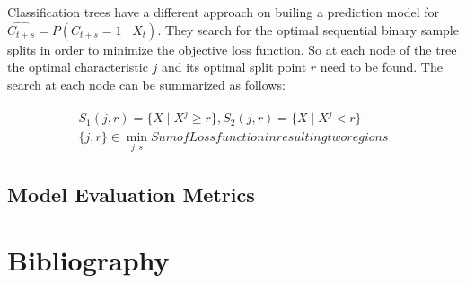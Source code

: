 \documentclass[12pt,titlepage]{article}
\begin{document}
Classification trees have a different approach on builing a prediction model for $\widehat{C_{t+s}} = P(C_{t+s}=1\mid X_{t})$. They search for the optimal sequential binary sample splits in order to minimize the objective loss function. So at each node of the tree the optimal characteristic $j$ and its optimal split point $r$ need to be found. The search at each node can be summarized as follows:

\begin{equation} \label{dec_tree}
    \begin{aligned}
        S_{1}(j, r) = \{X\mid X^{j}\geq r\} , S_{2}(j, r) = \{X\mid X^{j}< r\} \\
        \{j, r\} \in \min_{j, s} Sum of Loss function in resulting two regions
    \end{aligned}
\end{equation}

\subsection{Model Evaluation Metrics} \par

\newpage

\thispagestyle{empty}

\section*{Bibliography}
\vspace*{6mm}
\end{document}
